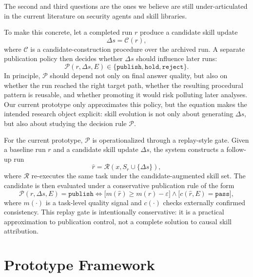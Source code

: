 \documentclass[11pt]{article}
\begin{document}
The second and third questions are the ones we believe are still under-articulated in
the current literature on security agents and skill libraries.

To make this concrete, let a completed run $r$ produce a candidate skill update
\begin{equation}
    \Delta s = \mathcal{C}(r),
\end{equation}
where $\mathcal{C}$ is a candidate-construction procedure over the archived run.  A
separate publication policy then decides whether $\Delta s$ should influence later runs:
\begin{equation}
    \mathcal{P}(r, \Delta s, E) \in \{\texttt{publish}, \texttt{hold}, \texttt{reject}\}.
\end{equation}
In principle, $\mathcal{P}$ should depend not only on final answer quality, but also on
whether the run reached the right target path, whether the resulting procedural pattern
is reusable, and whether promoting it would risk polluting later analyses.  Our current
prototype only approximates this policy, but the equation makes the intended research
object explicit: skill evolution is not only about generating $\Delta s$, but also about
studying the decision rule $\mathcal{P}$.

For the current prototype, $\mathcal{P}$ is operationalized through a replay-style gate.
Given a baseline run $r$ and a candidate skill update $\Delta s$, the system constructs
a follow-up run
\begin{equation}
    \hat{r} = \mathcal{R}(x, S_r \cup \{\Delta s\}),
\end{equation}
where $\mathcal{R}$ re-executes the same task under the candidate-augmented skill set.
The candidate is then evaluated under a conservative publication rule of the form
\begin{equation}
    \mathcal{P}(r, \Delta s, E) = \texttt{publish}
    \iff
    \bigl[m(\hat{r}) \geq m(r) - \varepsilon \bigr]
    \wedge
    \bigl[c(\hat{r},E)=\texttt{pass}\bigr],
\end{equation}
where $m(\cdot)$ is a task-level quality signal and $c(\cdot)$ checks externally
confirmed consistency.  This replay gate is intentionally conservative: it is a
practical approximation to publication control, not a complete solution to causal skill
attribution.

\section{Prototype Framework}
\label{sec:framework}
\end{document}
